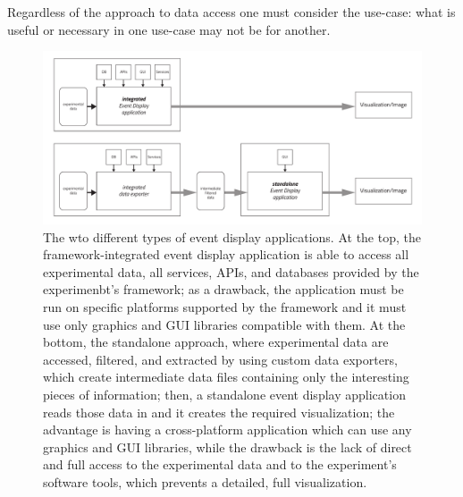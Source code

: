 \documentclass[12pt,a4paper]{article}
\begin{document}
Regardless of the approach to data access one must consider the use-case: what is useful or necessary in one use-case may not be for another.


\begin{figure}
	\centering
	\includegraphics[width=0.7\linewidth]{img/eventDisplays_applications_types}
	\caption[Different types of event display applications]{The wto different types of event display applications. At the top, the framework-integrated event display application is able to access all experimental data, all services, APIs, and databases provided by the experimenbt's framework; as a drawback, the application must be run on specific platforms supported by the framework and it must use only graphics and GUI libraries compatible with them. At the bottom, the standalone approach, where experimental data are accessed, filtered, and extracted by using custom data exporters, which create intermediate data files containing only the interesting pieces of information; then, a standalone event display application reads those data in and it creates the required visualization; the advantage is having a cross-platform application which can use any graphics and GUI libraries, while the drawback is the lack of direct and full access to the experimental data and to the experiment's software tools, which prevents a detailed, full visualization.}
	\label{fig:eventdisplaysapplicationstypes}
\end{figure}




\end{document}
